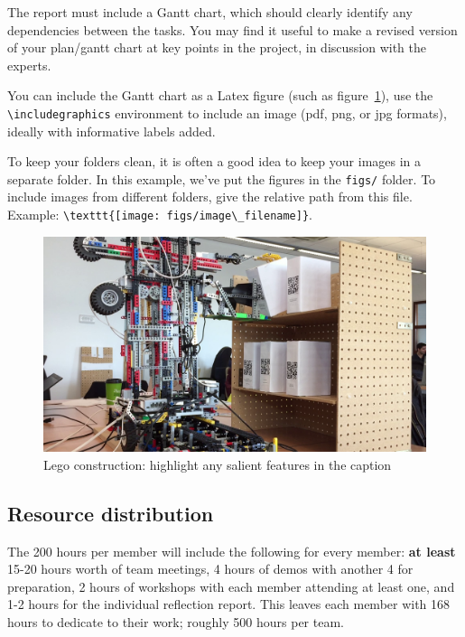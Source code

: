 \documentclass{article}
\begin{document}
The report must include a Gantt chart, which should clearly identify any dependencies between the tasks. You may find it useful to make a revised version of your plan/gantt chart at key points in the project, in discussion with the experts. 

You can include the Gantt chart as a Latex figure (such as figure~\ref{fig:sample-fig}), use the \verb+\includegraphics+ environment to include an image (pdf, png, or jpg formats), ideally with informative labels added. 

To keep your folders clean, it is often a good idea to keep your images in a separate folder. In this example, we've put the figures in the \texttt{figs/} folder. To include images from different folders, give the relative path from this file. Example: \verb+\texttt{[image: figs/image\_filename]}+.

\begin{figure}[tb]
\vskip 5mm
\begin{center}
\centerline{\includegraphics[width=\columnwidth]{figs/crane}}
\caption{Lego construction: highlight any salient features in the caption}
\label{fig:sample-fig}
\end{center}
\vskip -5mm
\end{figure} 


\subsection{Resource distribution}

The 200 hours per member will include the following for every member: {\bf at least} 15-20 hours worth of team meetings, 4 hours of demos with another 4 for preparation, 2 hours of workshops with each member attending at least one, and 1-2 hours for the individual reflection report. This leaves each member with 168 hours to dedicate to their work; roughly 500 hours per team.
\end{document}
